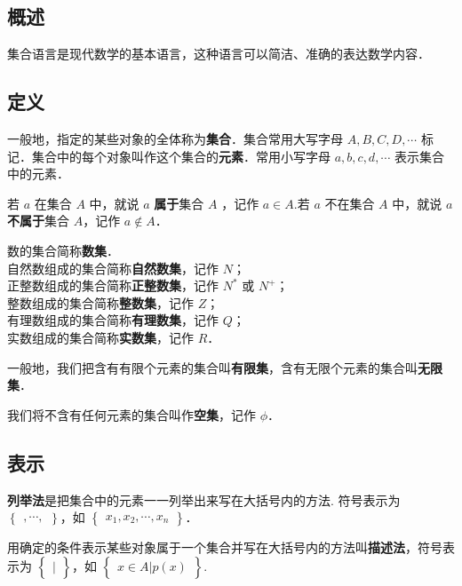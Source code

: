 
\begin{issues}
\issueDraft
\end{issues}

\subsection{概述}
集合语言是现代数学的基本语言，这种语言可以简洁、准确的表达数学内容．

\subsection{定义}
一般地，指定的某些对象的全体称为\textbf{集合}．集合常用大写字母 $A,B,C,D,\cdots$ 标记．集合中的每个对象叫作这个集合的\textbf{元素}．常用小写字母 $a,b,c,d,\cdots$ 表示集合中的元素．

若 $a$ 在集合 $A$ 中，就说 $a$ \textbf{属于}集合 $A$ ，记作 $a \in A$.若 $a$ 不在集合 $A$ 中，就说 $a$ \textbf{不属于}集合 $A$，记作 $a\notin A$．

数的集合简称\textbf{数集}．\\
自然数组成的集合简称\textbf{自然数集}，记作 $N$；\\
正整数组成的集合简称\textbf{正整数集}，记作 $N^{*}$ 或 $N^{+}$；\\
整数组成的集合简称\textbf{整数集}，记作 $Z$；\\
有理数组成的集合简称\textbf{有理数集}，记作 $Q$；\\
实数组成的集合简称\textbf{实数集}，记作 $R$．

一般地，我们把含有有限个元素的集合叫\textbf{有限集}，含有无限个元素的集合叫\textbf{无限集}．

我们将不含有任何元素的集合叫作\textbf{空集}，记作 $\phi$．

\subsection{表示}
\textbf{列举法}是把集合中的元素一一列举出来写在大括号内的方法.
符号表示为 $\begin{Bmatrix} ,\cdots, \end{Bmatrix}$，如 $\begin{Bmatrix} x_1,x_2, \cdots ,x_n \end{Bmatrix}$．

用确定的条件表示某些对象属于一个集合并写在大括号内的方法叫\textbf{描述法}，符号表示为 $\begin{Bmatrix} | \end{Bmatrix}$，如 $\begin{Bmatrix} x\in A|p(x) \end{Bmatrix}$.

